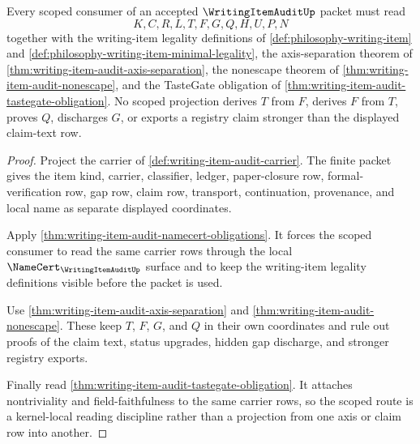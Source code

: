 \begin{theorem}
\label{thm:writing-item-audit-scoped-kernel-route}
Every scoped consumer of an accepted $\WritingItemAuditUp$ packet must read
$$
K,C,R,L,T,F,G,Q,H,U,P,N
$$
together with the writing-item legality definitions of \autoref{def:philosophy-writing-item} and \autoref{def:philosophy-writing-item-minimal-legality}, the axis-separation theorem of \autoref{thm:writing-item-audit-axis-separation}, the nonescape theorem of \autoref{thm:writing-item-audit-nonescape}, and the TasteGate obligation of \autoref{thm:writing-item-audit-tastegate-obligation}. No scoped projection derives $T$ from $F$, derives $F$ from $T$, proves $Q$, discharges $G$, or exports a registry claim stronger than the displayed claim-text row.
\end{theorem}
\begin{proof}
Project the carrier of \autoref{def:writing-item-audit-carrier}. The finite packet gives the item kind, carrier, classifier, ledger, paper-closure row, formal-verification row, gap row, claim row, transport, continuation, provenance, and local name as separate displayed coordinates.

Apply \autoref{thm:writing-item-audit-namecert-obligations}. It forces the scoped consumer to read the same carrier rows through the local $\NameCert_{\WritingItemAuditUp}$ surface and to keep the writing-item legality definitions visible before the packet is used.

Use \autoref{thm:writing-item-audit-axis-separation} and \autoref{thm:writing-item-audit-nonescape}. These keep $T$, $F$, $G$, and $Q$ in their own coordinates and rule out proofs of the claim text, status upgrades, hidden gap discharge, and stronger registry exports.

Finally read \autoref{thm:writing-item-audit-tastegate-obligation}. It attaches nontriviality and field-faithfulness to the same carrier rows, so the scoped route is a kernel-local reading discipline rather than a projection from one axis or claim row into another.
\end{proof}

